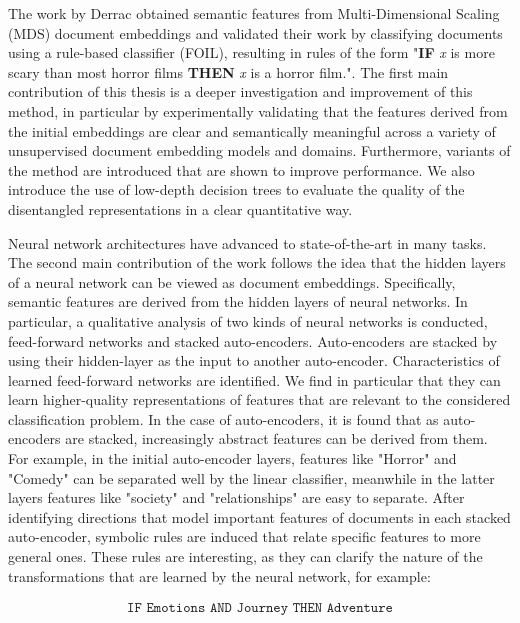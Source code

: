\documentclass[a4paper,oneside,onecolumn,openright,12pt]{book}
\begin{document}

The work by Derrac \cite{Derrac2015} obtained semantic features from Multi-Dimensional Scaling (MDS) document embeddings and validated their work by classifying documents using a rule-based classifier (FOIL), resulting in rules of the form "\textbf{IF} \textit{x} is more scary than most horror films \textbf{THEN} \textit{x} is a horror film.". The first main contribution of this thesis is a deeper investigation and improvement of this method, in particular by  experimentally validating that the  features derived from the initial embeddings are clear and semantically meaningful across a variety of unsupervised document embedding models and domains. Furthermore, variants of the method are introduced that are shown to improve  performance. We also introduce the use of low-depth decision trees to evaluate the quality of the disentangled representations in a clear quantitative way.


Neural network architectures have advanced to  state-of-the-art  in many tasks. The second main contribution of the work  follows the idea that the  hidden layers of a neural network can be viewed as document embeddings. Specifically, semantic features are derived from the  hidden layers of neural networks. In particular, a qualitative analysis of two kinds of neural networks is conducted, feed-forward networks and stacked auto-encoders. Auto-encoders are  stacked by using their hidden-layer as the input  to another auto-encoder. Characteristics of  learned feed-forward networks are identified. We find in particular that  they can learn higher-quality representations of  features that are relevant to the considered classification problem. In the case of auto-encoders, it is found  that as  auto-encoders are  stacked, increasingly abstract features can be derived from them. For example, in the initial auto-encoder layers, features like "Horror" and "Comedy" can be separated well by the linear classifier, meanwhile in the latter layers features like "society" and "relationships" are easy to separate. After identifying directions that model important features of documents in each stacked auto-encoder, symbolic rules are induced that relate specific features to more general ones. These rules are interesting, as they can clarify the nature of the transformations that are learned by the neural network, for example:

\begin{align}\label{rule1}\texttt{IF Emotions  AND  Journey THEN Adventure}\end{align} 
\end{document}

